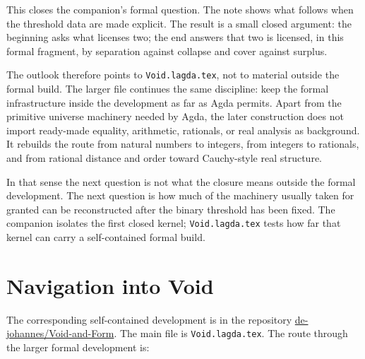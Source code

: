 \documentclass[11pt]{article}
\begin{document}
This closes the companion's formal question.  The note shows what
follows when the threshold data are made explicit.  The result is a
small closed argument: the beginning asks what licenses two; the end
answers that two is licensed, in this formal fragment, by separation
against collapse and cover against surplus.

The outlook therefore points to \texttt{Void.lagda.tex}, not to material
outside the formal build.  The larger file continues the same discipline:
keep the formal infrastructure inside the development as far as Agda
permits.  Apart from the primitive universe machinery needed by Agda,
the later construction does not import ready-made equality, arithmetic,
rationals, or real analysis as background.  It rebuilds the route from
natural numbers to integers, from integers to rationals, and from
rational distance and order toward Cauchy-style real structure.

In that sense the next question is not what the closure means outside
the formal development.  The next question is how much of the machinery
usually taken for granted can be reconstructed after the binary
threshold has been fixed.  The companion isolates the first closed
kernel; \texttt{Void.lagda.tex} tests how far that kernel can carry a
self-contained formal build.

\section{Navigation into Void}

The corresponding self-contained development is in the repository
\href{https://github.com/de-johannes/Void-and-Form}{de-johannes/Void-and-Form}.
The main file is \texttt{Void.lagda.tex}.  The route through the larger
formal development is:
\end{document}
